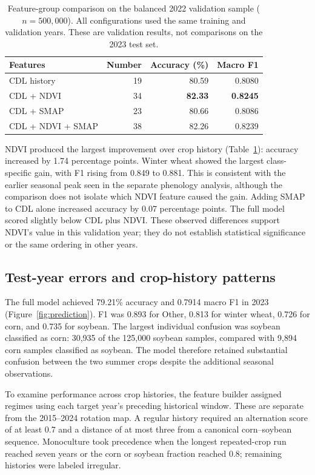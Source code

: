 \begin{table}[htbp]
\centering
\small
\begin{tabular}{lrrr}
\hline
Features & Number & Accuracy (\%) & Macro F1 \\
\hline
CDL history & 19 & 80.59 & 0.8080 \\
CDL + NDVI & 34 & \textbf{82.33} & \textbf{0.8245} \\
CDL + SMAP & 23 & 80.66 & 0.8086 \\
CDL + NDVI + SMAP & 38 & 82.26 & 0.8239 \\
\hline
\end{tabular}
\caption{Feature-group comparison on the balanced 2022 validation sample
($n=500{,}000$). All configurations used the same training and validation
years. These are validation results, not comparisons on the 2023 test set.}
\label{tab:ablation}
\end{table}

NDVI produced the largest improvement over crop history
(Table~\ref{tab:ablation}): accuracy increased by 1.74 percentage points.
Winter wheat showed the largest class-specific gain, with F1 rising from
0.849 to 0.881. This is consistent with the earlier seasonal peak seen in
the separate phenology analysis, although the comparison does not isolate
which NDVI feature caused the gain. Adding SMAP to CDL alone increased
accuracy by 0.07 percentage points. The full model scored slightly below
CDL plus NDVI. These observed differences support NDVI's value in this
validation year; they do not establish statistical significance or the same
ordering in other years.

\subsection{Test-year errors and crop-history patterns}

The full model achieved 79.21\% accuracy and 0.7914 macro F1 in 2023
(Figure~\ref{fig:prediction}). F1 was 0.893 for Other, 0.813 for
winter wheat, 0.726 for corn, and 0.735 for soybean. The largest individual
confusion was soybean classified as corn: 30,935 of the 125,000 soybean
samples, compared with 9,894 corn samples classified as soybean. The model
therefore retained substantial confusion between the two summer crops
despite the additional seasonal observations.

To examine performance across crop histories, the feature builder assigned
regimes using each target year's preceding historical window. These are
separate from the 2015--2024 rotation map. A regular history required an
alternation score of at least 0.7 and a distance of at most three from a
canonical corn--soybean sequence. Monoculture took precedence when the
longest repeated-crop run reached seven years or the corn or soybean
fraction reached 0.8; remaining histories were labeled irregular.

